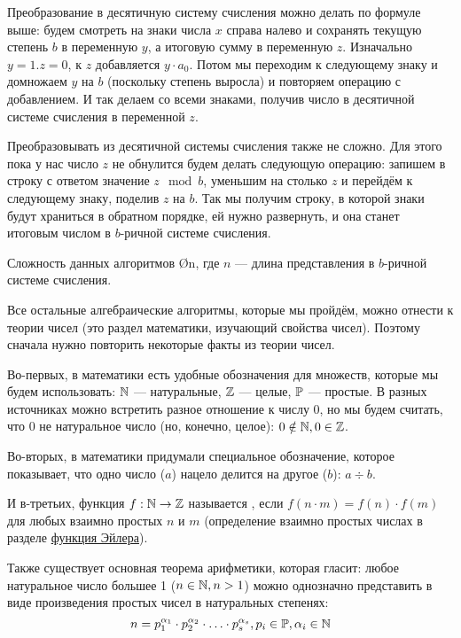 Преобразование в десятичную систему счисления можно делать по формуле выше: будем смотреть на знаки числа $x$ справа налево и сохранять текущую степень $b$ в переменную $y$, а итоговую сумму в переменную $z$. Изначально $y = 1. z = 0$, к $z$ добавляется $y \cdot a_0$. Потом мы переходим к следующему знаку и домножаем $y$ на $b$ (поскольку степень выросла) и повторяем операцию с добавлением. И так делаем со всеми знаками, получив число в десятичной системе счисления в переменной $z$.

Преобразовывать из десятичной системы счисления также не сложно. Для этого пока у нас число $z$ не обнулится будем делать следующую операцию: запишем в строку с ответом значение $z \mod b$, уменьшим на столько $z$ и перейдём к следующему знаку, поделив $z$ на $b$. Так мы получим строку, в которой знаки будут храниться в обратном порядке, ей нужно развернуть, и она станет итоговым числом в $b$-ричной системе счисления.

Сложность данных алгоритмов \O{n}, где $n$ — длина представления в $b$-ричной системе счисления.


Все остальные алгебраические алгоритмы, которые мы пройдём, можно отнести к теории чисел (это раздел математики, изучающий свойства чисел). Поэтому сначала нужно повторить некоторые факты из теории чисел.

Во-первых, в математики есть удобные обозначения для множеств, которые мы будем использовать: $\mathbb{N}$ — натуральные, $\mathbb{Z}$ — целые, $\mathbb{P}$ — простые. В разных источниках можно встретить разное отношение к числу 0, но мы будем считать, что 0 не натуральное число (но, конечно, целое): $0 \notin \mathbb{N}, 0 \in \mathbb{Z}$.

Во-вторых, в математики придумали специальное обозначение, которое показывает, что одно число ($a$) нацело делится на другое ($b$): $a \div b$.

И в-третьих, функция $f: \mathbb{N} \to \mathbb{Z}$ называется , если $f(n \cdot m) = f(n) \cdot f(m)$ для любых взаимно простых $n$ и $m$ (определение взаимно простых числах в разделе \hyperlink{euler_function}{функция Эйлера}).

Также существует основная теорема арифметики, которая гласит: любое натуральное число большее 1 ($n \in \mathbb{N}, n > 1$) можно однозначно представить в виде произведения простых чисел в натуральных степенях:
$$n = p_1^{\alpha_1} \cdot p_2^{\alpha_2} \cdot \ldots \cdot p_s^{\alpha_s}, p_i \in \mathbb{P}, \alpha_i \in \mathbb{N}$$

